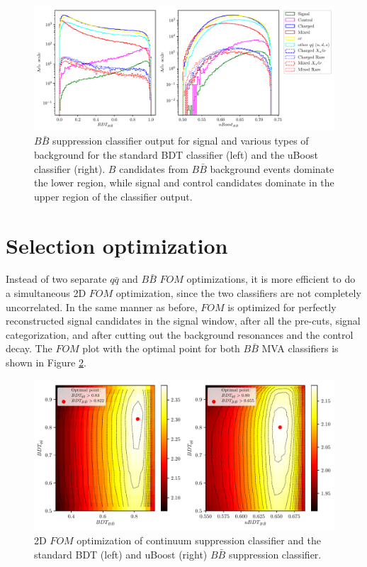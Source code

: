 \documentclass[oneside,a4paper,openany,12pt]{scrbook}
\begin{document}
\begin{figure}[H]
\centering
\captionsetup{width=0.8\linewidth}
\includegraphics[width=\linewidth]{fig/bb_BDT}
\caption{$B\bar B$ suppression classifier output for signal and various types of background for the standard BDT classifier (left) and the uBoost classifier (right). $B$ candidates from $B\bar B$ background events dominate the lower region, while signal and control candidates dominate in the upper region of the classifier output.}
\label{fig:bbmva}
\end{figure}

\section{Selection optimization}

Instead of two separate $q \bar q$ and $B \bar B$ $FOM$ optimizations, it is more efficient to do a simultaneous 2D $FOM$ optimization, since the two classifiers are not completely uncorrelated. In the same manner as before, $FOM$ is optimized for perfectly reconstructed signal candidates in the signal window, after all the pre-cuts, signal categorization, and after cutting out the background resonances and the control decay. The $FOM$ plot with the optimal point for both $B \bar B$ MVA classifiers is shown in Figure \ref{fig:mvafom}.

\begin{figure}[H]
\centering
\captionsetup{width=0.8\linewidth}
\includegraphics[width=\linewidth]{fig/mva_fom}
\caption{2D $FOM$ optimization of continuum suppression classifier and the standard BDT (left) and uBoost (right) $B\bar B$ suppression classifier.}
\label{fig:mvafom}
\end{figure}
\end{document}
